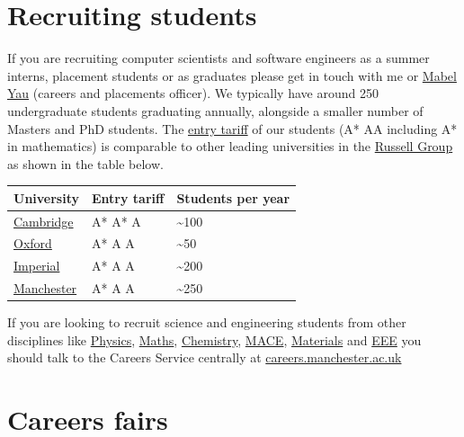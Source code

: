 \documentclass[12pt,]{book}
\begin{document}
\hypertarget{recruiting-students}{%
\section{Recruiting students}\label{recruiting-students}}

If you are recruiting computer scientists and software engineers as a summer interns, placement students or as graduates please get in touch with me or \href{https://uk.linkedin.com/in/mabel-yau}{Mabel Yau} (careers and placements officer). We typically have around 250 undergraduate students graduating annually, alongside a smaller number of Masters and PhD students. The \href{https://www.ucas.com/ucas/tariff-calculator}{entry tariff} of our students (A* AA including A* in mathematics) is comparable to other leading universities in the \href{https://en.wikipedia.org/wiki/Russell_Group}{Russell Group} as shown in the table below.

\begin{longtable}[]{@{}lll@{}}
\toprule
University & Entry tariff & Students per year\tabularnewline
\midrule
\endhead
\href{https://www.undergraduate.study.cam.ac.uk/courses/computer-science}{Cambridge} & A* A* A & \textasciitilde{}100\tabularnewline
\href{http://www.ox.ac.uk/admissions/undergraduate/courses-listing/computer-science}{Oxford} & A* A A & \textasciitilde{}50\tabularnewline
\href{https://www.imperial.ac.uk/computing/prospective-students/courses/ug/beng-meng-computing/}{Imperial} & A* A A & \textasciitilde{}200\tabularnewline
\href{https://www.manchester.ac.uk/study/undergraduate/courses/2019/00560/bsc-computer-science/}{Manchester} & A* A A & \textasciitilde{}250\tabularnewline
\bottomrule
\end{longtable}

If you are looking to recruit science and engineering students from other disciplines like \href{https://www.physics.manchester.ac.uk/}{Physics}, \href{https://www.maths.manchester.ac.uk/}{Maths}, \href{https://www.chemistry.manchester.ac.uk/}{Chemistry}, \href{https://www.mace.manchester.ac.uk/}{MACE}, \href{https://www.materials.manchester.ac.uk/}{Materials} and \href{https://www.eee.manchester.ac.uk/}{EEE} you should talk to the Careers Service centrally at \href{http://www.careers.manchester.ac.uk/}{careers.manchester.ac.uk}

\hypertarget{careers-fairs}{%
\section{Careers fairs}\label{careers-fairs}}
\end{document}
